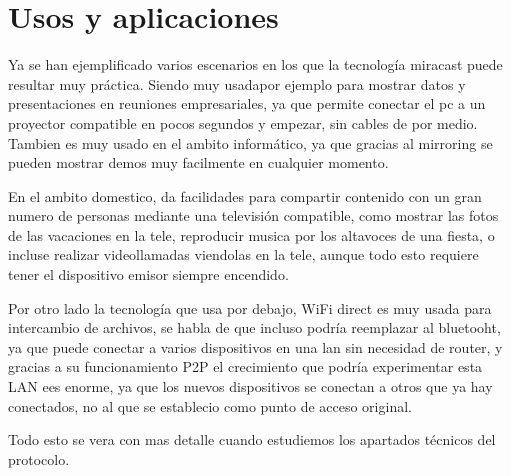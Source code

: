 \section{Usos y aplicaciones}

Ya se han ejemplificado varios escenarios en los que la tecnología miracast puede resultar muy práctica. Siendo muy usadapor ejemplo para mostrar datos y presentaciones en reuniones empresariales, ya que permite conectar el pc a un proyector compatible en pocos segundos y empezar, sin cables de por medio. Tambien es muy usado en el ambito informático, ya que gracias al mirroring se pueden mostrar demos muy facilmente en cualquier momento.

En el ambito domestico, da facilidades para compartir contenido con un gran numero de personas mediante una televisión compatible, como mostrar las fotos de las vacaciones en la tele, reproducir musica por los altavoces de una fiesta, o incluse realizar videollamadas viendolas en la tele, aunque todo esto requiere tener el dispositivo emisor siempre encendido.

Por otro lado la tecnología que usa por debajo, WiFi direct es muy usada para intercambio de archivos, se habla de que incluso podría reemplazar al bluetooht, ya que puede conectar a varios dispositivos en una lan sin necesidad de router, y gracias a su funcionamiento P2P el crecimiento que podría experimentar esta LAN ees enorme, ya que los nuevos dispositivos se conectan a otros que ya hay conectados, no al que se establecio como punto de acceso original.

Todo esto se vera con mas detalle cuando estudiemos los apartados técnicos del protocolo.
